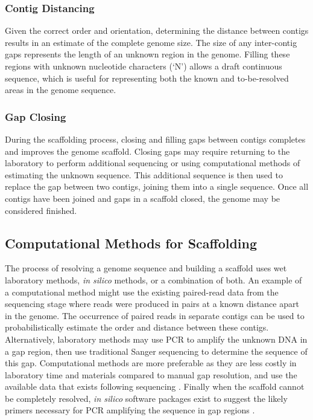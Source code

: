 \documentclass[10pt]{bmc_article}
\newenvironment{bmcformat}{\begin{raggedright}\baselineskip20pt\sloppy\setboolean{publ}{false}}{\end{raggedright}\baselineskip20pt\sloppy}
\begin{document}
\begin{bmcformat}
\subsubsection*{Contig Distancing} %

Given the correct order and orientation, determining the distance between
contigs results in an estimate of the complete genome size. The size of any
inter-contig gaps represents the length of an unknown region in the genome.
Filling these regions with unknown nucleotide characters (`N') allows a draft
continuous sequence, which is useful for representing both the known and
to-be-resolved areas in the genome sequence.

\subsubsection*{Gap Closing} %

During the scaffolding process, closing and filling gaps between contigs
completes and improves the genome scaffold. Closing gaps may require returning
to the laboratory to perform additional sequencing or using computational
methods of estimating the unknown sequence. This additional sequence is then
used to replace the gap between two contigs, joining them into a single
sequence. Once all contigs have been joined and gaps in a scaffold closed, the
genome may be considered finished.

\subsection*{Computational Methods for Scaffolding} %

The process of resolving a genome sequence and building a scaffold uses wet
laboratory methods, \emph{in silico} methods, or a combination of both. An
example of a computational method might use the existing paired-read data from
the sequencing stage where reads were produced in pairs at a known distance
apart in the genome. The occurrence of paired reads in separate contigs can be
used to probabilistically estimate the order and distance between these
contigs. Alternatively, laboratory methods may use PCR to amplify the unknown
DNA in a gap region, then use traditional Sanger sequencing to determine the
sequence of this gap. Computational methods are more preferable as they are
less costly in laboratory time and materials compared to manual gap resolution,
and use the available data that exists following sequencing
\cite{nagarajan2010}. Finally when the scaffold cannot be completely resolved,
\emph{in silico} software packages exist to suggest the likely primers
necessary for PCR amplifying the sequence in gap regions \cite{gordon2001}. \pb


\end{bmcformat}
\end{document}
